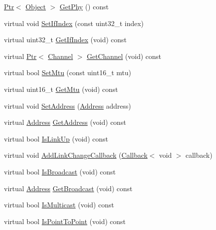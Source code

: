 \begin{DoxyCompactItemize}
\item 
\hyperlink{classns3_1_1Ptr}{Ptr}$<$ \hyperlink{classns3_1_1Object}{Object} $>$ \hyperlink{classns3_1_1AlohaNoackNetDevice_a523fb1664663a8f4257570ef80e81f1b}{Get\+Phy} () const 
\item 
virtual void \hyperlink{classns3_1_1AlohaNoackNetDevice_aa6897570e4d054e9fafb06069467c63c}{Set\+If\+Index} (const uint32\+\_\+t index)
\item 
virtual uint32\+\_\+t \hyperlink{classns3_1_1AlohaNoackNetDevice_a5200e663a1f8c1e1324f8b2b56040621}{Get\+If\+Index} (void) const 
\item 
virtual \hyperlink{classns3_1_1Ptr}{Ptr}$<$ \hyperlink{classns3_1_1Channel}{Channel} $>$ \hyperlink{classns3_1_1AlohaNoackNetDevice_ad3eebd247aee2dbcde55274c90f3e905}{Get\+Channel} (void) const 
\item 
virtual bool \hyperlink{classns3_1_1AlohaNoackNetDevice_ae33c8e6e61a301d261e415feda358f49}{Set\+Mtu} (const uint16\+\_\+t mtu)
\item 
virtual uint16\+\_\+t \hyperlink{classns3_1_1AlohaNoackNetDevice_a32fa3100b6d183928d52e963730234ff}{Get\+Mtu} (void) const 
\item 
virtual void \hyperlink{classns3_1_1AlohaNoackNetDevice_a3632606e41b9e9eab9eaf285e44aef60}{Set\+Address} (\hyperlink{classns3_1_1Address}{Address} address)
\item 
virtual \hyperlink{classns3_1_1Address}{Address} \hyperlink{classns3_1_1AlohaNoackNetDevice_a4d49b117dc0383d5e87faaed1de2c6b5}{Get\+Address} (void) const 
\item 
virtual bool \hyperlink{classns3_1_1AlohaNoackNetDevice_aa8c973f1a673748728356ddd3e201c9e}{Is\+Link\+Up} (void) const 
\item 
virtual void \hyperlink{classns3_1_1AlohaNoackNetDevice_afef86a68717e7cc35eba603e44155e95}{Add\+Link\+Change\+Callback} (\hyperlink{classns3_1_1Callback}{Callback}$<$ void $>$ callback)
\item 
virtual bool \hyperlink{classns3_1_1AlohaNoackNetDevice_accc573ee10edefb5d9c2d7aea711fbb9}{Is\+Broadcast} (void) const 
\item 
virtual \hyperlink{classns3_1_1Address}{Address} \hyperlink{classns3_1_1AlohaNoackNetDevice_a69c16884fec66618f3fc5176ffce9927}{Get\+Broadcast} (void) const 
\item 
virtual bool \hyperlink{classns3_1_1AlohaNoackNetDevice_ad0906f013fbcd8062518b063343727ac}{Is\+Multicast} (void) const 
\item 
virtual bool \hyperlink{classns3_1_1AlohaNoackNetDevice_a02c3d265fd2879915286d02fe8c6a6e2}{Is\+Point\+To\+Point} (void) const 

\end{DoxyCompactItemize}
